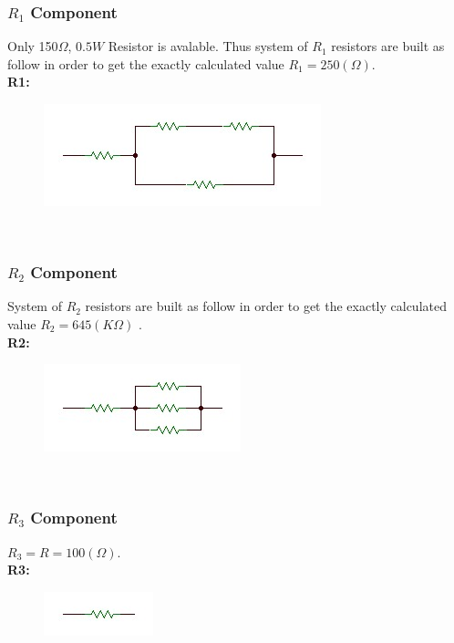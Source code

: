 \documentclass[12pt]{extarticle}
\newcommand{\<}{\langle}
\newcommand\tab[1][1cm]{\hspace*{#1}}
\renewcommand{\>}{\rangle}
\theoremstyle{definition}
\begin{document}
\begin{normalsize}
\subsubsection{$R_1$ Component}
Only 150$\Omega$, $0.5W$ Resistor is avalable. Thus system of $R_1$ resistors are built as follow in order to get the exactly calculated value $R_1 = 250(\Omega)$.\\
{\bfseries R1:}
	\begin{figure}[ht]
		\begin{center}
			
			\includegraphics[scale=0.75]{R1.JPG}\\
	
		\end{center}
		
		
	\end{figure}
	\\
\subsubsection{$R_2$ Component}
System of $R_2$ resistors are built as follow in order to get the exactly calculated value $R_2 = 645(K\Omega)$ .\\
{\bfseries R2:}
	\begin{figure}[ht]
		\begin{center}
			
			\includegraphics[scale=0.75]{R2.JPG}\\
	
		\end{center}
		
		
	\end{figure}
	\\
\subsubsection{$R_3$ Component}
\tab $R_3 = R = 100(\Omega)$.\\
{\bfseries R3:}
	\begin{figure}[ht]
		\begin{center}
			
			\includegraphics[scale=0.75]{R3.JPG}\\
	
		\end{center}
		
		
	\end{figure}
\end{normalsize}
\end{document}
